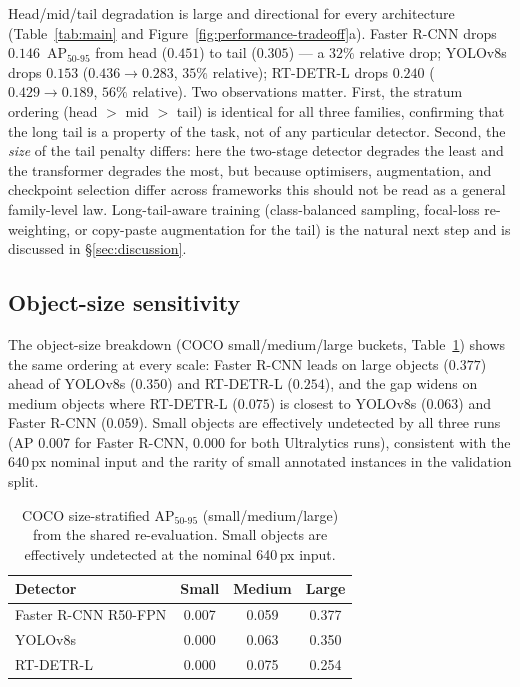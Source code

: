 \documentclass[11pt,a4paper,twocolumn]{article}
\begin{document}
Head/mid/tail degradation is large and directional for every architecture (Table~\ref{tab:main} and Figure~\ref{fig:performance-tradeoff}a). Faster R-CNN drops $0.146$~AP$_{50\text{-}95}$ from head ($0.451$) to tail ($0.305$) --- a $32\%$ relative drop; YOLOv8s drops $0.153$ ($0.436 \to 0.283$, $35\%$ relative); RT-DETR-L drops $0.240$ ($0.429 \to 0.189$, $56\%$ relative). Two observations matter. First, the stratum ordering (head $>$ mid $>$ tail) is identical for all three families, confirming that the long tail is a property of the task, not of any particular detector. Second, the \emph{size} of the tail penalty differs: here the two-stage detector degrades the least and the transformer degrades the most, but because optimisers, augmentation, and checkpoint selection differ across frameworks this should not be read as a general family-level law. Long-tail-aware training (class-balanced sampling, focal-loss re-weighting, or copy-paste augmentation for the tail) is the natural next step and is discussed in \S\ref{sec:discussion}.

\subsection{Object-size sensitivity}
\label{sec:results-size}

The object-size breakdown (COCO small/medium/large buckets, Table~\ref{tab:size}) shows the same ordering at every scale: Faster R-CNN leads on large objects ($0.377$) ahead of YOLOv8s ($0.350$) and RT-DETR-L ($0.254$), and the gap widens on medium objects where RT-DETR-L ($0.075$) is closest to YOLOv8s ($0.063$) and Faster R-CNN ($0.059$). Small objects are effectively undetected by all three runs (AP $0.007$ for Faster R-CNN, $0.000$ for both Ultralytics runs), consistent with the $640$\,px nominal input and the rarity of small annotated instances in the validation split.

\begin{table}[t]
  \centering
  \small
  \caption{COCO size-stratified AP$_{50\text{-}95}$ (small/medium/large)
  from the shared re-evaluation. Small objects are effectively
  undetected at the nominal 640\,px input.}
  \label{tab:size}
  \setlength{\tabcolsep}{2pt}
  \begin{tabular*}{\columnwidth}{@{\extracolsep{\fill}}lccc@{}}
    \toprule
    Detector & Small & Medium & Large \\
    \midrule
    Faster R-CNN R50-FPN & 0.007 & 0.059 & 0.377 \\
    YOLOv8s & 0.000 & 0.063 & 0.350 \\
    RT-DETR-L & 0.000 & 0.075 & 0.254 \\
    \bottomrule
  \end{tabular*}
\end{table}
\end{document}
